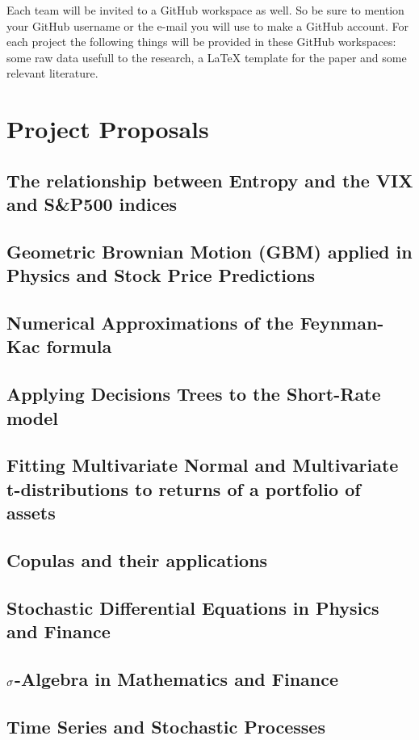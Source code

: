 \documentclass[11pt]{article}
\begin{document}
Each team will be invited to a GitHub workspace as well. So be sure to mention your GitHub username or the e-mail you will use to make a GitHub account. For each project the following things will be provided in these GitHub workspaces: some raw data usefull to the research, a LaTeX template for the paper and some relevant literature.

\section{Project Proposals}

\subsection{The relationship between Entropy and the VIX and S\&P500 indices}

\subsection{Geometric Brownian Motion (GBM) applied in Physics and Stock Price Predictions}

\subsection{Numerical Approximations of the Feynman-Kac formula}

\subsection{Applying Decisions Trees to the Short-Rate model}

\subsection{Fitting Multivariate Normal and Multivariate t-distributions to returns of a portfolio of assets}

\subsection{Copulas and their applications}

\subsection{Stochastic Differential Equations in Physics and Finance}

\subsection{$\Huge{\sigma}$-Algebra in Mathematics and Finance}

\subsection{Time Series and Stochastic Processes}
\end{document}
